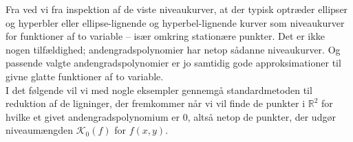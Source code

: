 Fra  ved vi fra inspektion af de viste niveaukurver, at der typisk optræder ellipser og hyperbler
eller ellipse-lignende og hyperbel-lignende kurver som niveaukur\-ver for funktioner af to variable -- især omkring stationære punkter. Det er ikke nogen tilfældighed; andengradspolynomier har netop sådanne niveaukurver.  Og passende valg\-te andengradspolynomier er jo samtidig gode approksimationer til givne glatte funktioner af to variable.\\


I det følgende vil vi med nogle eksempler gennemgå standardmetoden til reduktion af de ligninger, der fremkommer når vi vil finde de punkter i $\mathbb{R}^{2}$ for hvilke et givet andengradspolynomium er $0$, altså netop de punkter, der udgør niveaumængden $\mathcal{K}_{0}(f)$ for $f(x,y)$.


